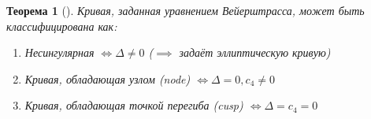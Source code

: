 \documentclass[12pt]{article}
\newtheorem{theorem}{Теорема}
\theoremstyle{definition}
\theoremstyle{definition}
\theoremstyle{definition}
\begin{document}
            \begin{theorem}[]
                \autocite[Thm. 1.4]{silverman}
                Кривая, заданная уравнением Вейерштрасса, может быть классифицирована как:
                \begin{enumerate}[itemsep=0pt, topsep=0pt, partopsep=0pt]
                    \item Несингулярная $\iff \Delta \neq 0$ ($\implies$ задаёт эллиптическую кривую) 
                    \item Кривая, обладающая узлом (node) $\iff \Delta = 0, c_4 \neq 0$ 
                    \item Кривая, обладающая точкой перегиба (cusp) $\iff \Delta = c_4 = 0$
                \end{enumerate}
            \end{theorem}
\end{document}
